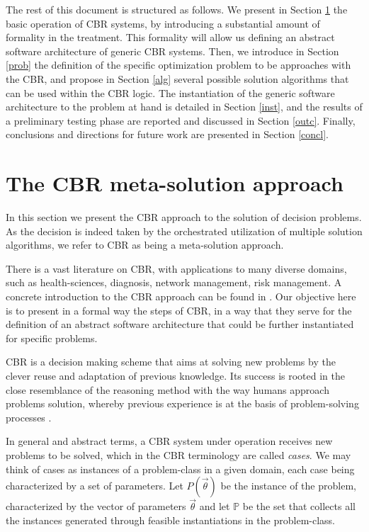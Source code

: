 \documentclass{IEEEtran}
\begin{document}
The rest of this document is structured as follows. 
We present in Section \ref{cbr} the basic operation of CBR systems, by introducing a substantial amount of formality in the treatment. This  formality will allow us defining an abstract software architecture of generic CBR systems. Then, we introduce in Section \ref{prob} the definition of the specific optimization problem to be approaches with the CBR, and propose in Section \ref{alg} several possible solution algorithms that can be used  within the CBR logic. The instantiation of the generic software architecture to the problem at hand is detailed in Section \ref{inst}, and the results of a preliminary testing phase are reported and discussed in Section \ref{outc}. Finally, conclusions and directions for future work are presented in Section \ref{concl}. 

\section{The CBR meta-solution approach}
\label{cbr}
In this section we present the CBR approach to the solution of decision problems. As the decision is indeed taken by the orchestrated utilization of multiple solution algorithms, we refer to CBR as being a meta-solution approach. 

There is a vast literature on CBR, with applications to many diverse domains, such as health-sciences, diagnosis, network management, risk management. A concrete introduction to the CBR approach can be found in \cite{Aamodt1994}. 
Our objective here is to present in a formal way the steps of CBR, in a way that they serve for the definition of an abstract software architecture that could be further instantiated for specific problems. 

CBR is a decision making scheme that aims at solving new problems by the clever  reuse and adaptation  of previous knowledge.
 Its success is rooted in the close resemblance of the reasoning method with the way humans approach problems solution, whereby previous experience is at the basis of  problem-solving processes \cite{Anderson1983}.


In general and abstract terms, a CBR system under operation receives new problems to be solved, which in the CBR terminology are called {\em cases}. 
We may think of cases as instances of a problem-class in a given domain, each case being characterized by a set of parameters. Let $P(\vec{\theta})$ be the instance of the problem, characterized by the vector of parameters $\vec{\theta}$ and let $\mathbb{P}$ be the set that collects all the instances generated through  feasible instantiations in the problem-class. 
\end{document}
